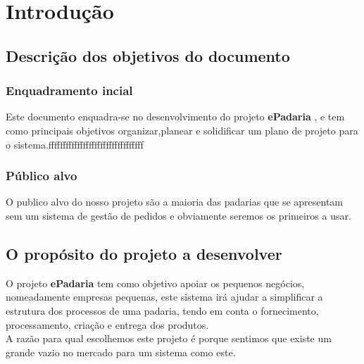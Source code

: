 \chapter{Introdução}
\label{introdução}
\section{Descrição dos objetivos do documento}
\subsection{Enquadramento incial}
Este documento enquadra-se no desenvolvimento do projeto \textbf{ePadaria} , e tem como principais objetivos organizar,planear e solidificar um plano de projeto para o sistema.fffffffffffffffffffffffffffffffff

\subsection{Público alvo}
O publico alvo do nosso projeto são a maioria das padarias que se apresentam sem um sistema de gestão de pedidos e obviamente seremos os primeiros a usar.

\section{O propósito do projeto a desenvolver}
O projeto \textbf{ePadaria} tem como objetivo apoiar os pequenos negócios, nomeadamente empresas pequenas, este sistema irá ajudar a simplificar a estrutura dos processos de uma padaria, tendo em conta o fornecimento, processamento, criação e entrega dos produtos.
\\
A razão para qual escolhemos este projeto é porque sentimos que existe um grande vazio no mercado para um sistema como este.
